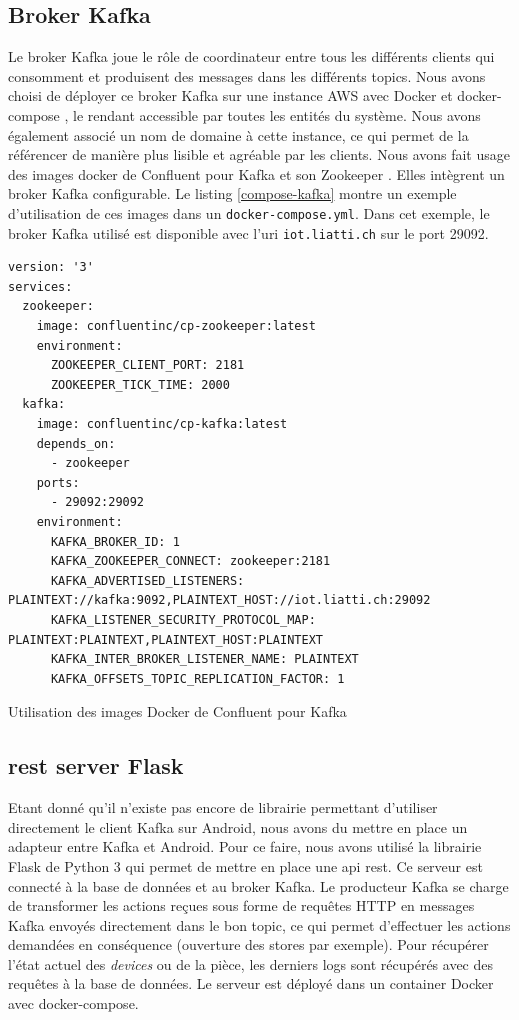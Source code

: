 \subsection{Broker Kafka}
Le broker Kafka joue le rôle de coordinateur entre tous les différents clients qui consomment et produisent des messages dans les différents topics. Nous avons choisi de déployer ce broker Kafka sur une instance AWS \cite{aws} avec Docker \cite{docker} et docker-compose \cite{docker-compose}, le rendant accessible par toutes les entités du système.
Nous avons également associé un nom de domaine à cette instance, ce qui permet de la référencer de manière plus lisible et agréable par les clients. Nous avons fait usage des images docker de Confluent \cite{confluent} pour Kafka \cite{cp-kafka} et son Zookeeper \cite{cp-zookeeper}. Elles intègrent un broker Kafka configurable. Le listing \ref{compose-kafka} montre un exemple d'utilisation de ces images dans un \texttt{docker-compose.yml}. Dans cet exemple, le broker Kafka utilisé est disponible avec l'\acrshort{uri} \texttt{iot.liatti.ch} sur le port 29092.
\begin{code}
    \begin{verbatim}
version: '3'
services:
  zookeeper:
    image: confluentinc/cp-zookeeper:latest
    environment:
      ZOOKEEPER_CLIENT_PORT: 2181
      ZOOKEEPER_TICK_TIME: 2000
  kafka:
    image: confluentinc/cp-kafka:latest
    depends_on:
      - zookeeper
    ports:
      - 29092:29092
    environment:
      KAFKA_BROKER_ID: 1
      KAFKA_ZOOKEEPER_CONNECT: zookeeper:2181
      KAFKA_ADVERTISED_LISTENERS: PLAINTEXT://kafka:9092,PLAINTEXT_HOST://iot.liatti.ch:29092
      KAFKA_LISTENER_SECURITY_PROTOCOL_MAP: PLAINTEXT:PLAINTEXT,PLAINTEXT_HOST:PLAINTEXT
      KAFKA_INTER_BROKER_LISTENER_NAME: PLAINTEXT
      KAFKA_OFFSETS_TOPIC_REPLICATION_FACTOR: 1
    \end{verbatim}
    \caption{Utilisation des images Docker de Confluent pour Kafka}
    \label{compose-kafka}
\end{code}

\subsection{\acrshort{rest} server Flask}
Etant donné qu'il n'existe pas encore de librairie permettant d'utiliser directement le client Kafka sur Android, nous avons du mettre en place un adapteur entre Kafka et Android.
Pour ce faire, nous avons utilisé la librairie Flask \cite{flask} de Python 3 qui permet de mettre en place une \acrshort{api} \acrshort{rest}. Ce serveur est connecté à la base de données et au broker Kafka. Le producteur Kafka se charge de transformer les actions reçues sous forme de requêtes HTTP en messages Kafka envoyés directement dans le bon topic, ce qui permet d'effectuer les actions demandées en conséquence (ouverture des stores par exemple). Pour récupérer l'état actuel des \textit{\textit{devices}} ou de la pièce, les derniers logs sont récupérés avec des requêtes à la base de données. Le serveur est déployé dans un container Docker avec docker-compose.

